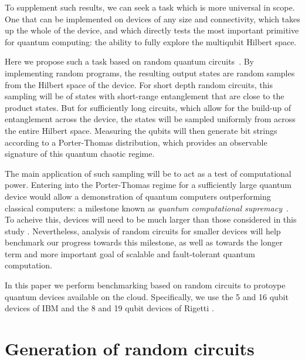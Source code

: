 \documentclass[aps,prl,twocolumn,showpacs,preprintnumbers]{revtex4-1}
\begin{document}
To supplement such results, we can seek a task which is more universal in scope. One that can be implemented on devices of any size and connectivity, which takes up the whole of the device, and which directly tests the most important primitive for quantum computing: the ability to fully explore the multiqubit Hilbert space.

Here we propose such a task based on random quantum circuits~\cite{boixo:18}. By implementing random programs, the resulting output states are random samples from the Hilbert space of the device. For short depth random circuits, this sampling will be of states with short-range entanglement that are close to the product states. But for sufficiently long circuits, which allow for the build-up of entanglement across the device, the states will be sampled uniformly from across the entire Hilbert space. Measuring the qubits will then generate bit strings according to a Porter-Thomas distribution, which provides an observable signature of this quantum chaotic regime.

The main application of such sampling will be to act as a test of computational power. Entering into the Porter-Thomas regime for a sufficiently large quantum device would allow a demonstration of quantum computers outperforming classical computers: a milestone known as \textit{quantum computational supremacy}~\cite{preskill:12}. To acheive this, devices will need to be much larger than those considered in this study \cite{chen:18}. Nevertheless, analysis of random circuits for smaller devices will help benchmark our progress towards this milestone, as well as towards the longer term and more important goal of scalable and fault-tolerant quantum computation.

In this paper we perform benchmarking based on random circuits to protoype quantum devices available on the cloud. Specifically, we use the 5 and 16 qubit devices of IBM \cite{ibm:backends} and the 8 and 19 qubit devices of Rigetti \cite{rigetti:acorn}.


\section{Generation of random circuits}
\end{document}
